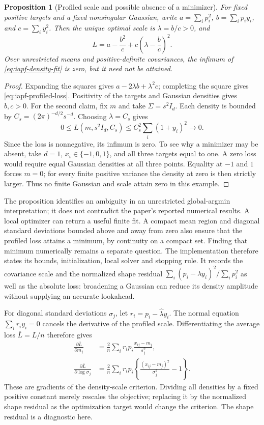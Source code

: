 \documentclass[11pt]{article}
\newtheorem{proposition}{Proposition}
\begin{document}
\begin{proposition}[Profiled scale and possible absence of a minimizer]
For fixed positive targets and a fixed nonsingular Gaussian, write
$a=\sum_i p_i^2$, $b=\sum_i p_i y_i$, and $c=\sum_i y_i^2$.
Then the unique optimal scale is $\lambda=b/c>0$, and
\begin{equation}
 L=a-\frac{b^2}{c}+c\left(\lambda-\frac bc\right)^2.
 \label{eq:iapf-profiled-loss}
\end{equation}
Over unrestricted means and positive-definite covariances, the infimum of
\eqref{eq:iapf-density-fit} is zero, but it need not be attained.
\end{proposition}
\begin{proof}
Expanding the squares gives $a-2\lambda b+\lambda^2c$; completing the
square gives \eqref{eq:iapf-profiled-loss}. Positivity of the targets and
Gaussian densities gives $b,c>0$.
For the second claim, fix $m$ and take $\Sigma=s^2I_d$. Each density is
bounded by $C_s=(2\pi)^{-d/2}s^{-d}$. Choosing $\lambda=C_s$ gives
\[
 0\le L(m,s^2I_d,C_s)
      \le C_s^2\sum_i(1+y_i)^2\longrightarrow0.
\]
Since the loss is nonnegative, its infimum is zero. To see why a minimizer
may be absent, take $d=1$, $x_i\in\{-1,0,1\}$, and all three targets
equal to one. A zero loss would require equal Gaussian densities at all
three points. Equality at $-1$ and $1$ forces $m=0$; for every finite
positive variance the density at zero is then strictly larger. Thus no
finite Gaussian and scale attain zero in this example.
\end{proof}

The proposition identifies an ambiguity in an unrestricted global-argmin
interpretation; it does not contradict the paper's reported numerical
results. A local optimizer can return a useful finite fit. A compact mean
region and diagonal standard deviations bounded above and away from zero
also ensure that the profiled loss attains a minimum, by continuity on a
compact set. Finding that minimum numerically remains a separate question.
The implementation therefore states its bounds, initialization, local
solver and stopping rule. It records the covariance scale and the normalized
shape residual $\sum_i(p_i-\widehat\lambda y_i)^2/\sum_i p_i^2$ as well as
the absolute loss: broadening a Gaussian can reduce its density amplitude
without supplying an accurate lookahead.

For diagonal standard deviations $\sigma_j$, let
$r_i=p_i-\widehat\lambda y_i$. The normal equation
$\sum_i r_i y_i=0$ cancels the derivative of the profiled scale. Differentiating
the average loss $\overline L=L/n$ therefore gives
\begin{align}
 \frac{\partial\overline L}{\partial m_j}
 &=\frac2n\sum_i r_i p_i\frac{x_{ij}-m_j}{\sigma_j^2},\\
 \frac{\partial\overline L}{\partial\log\sigma_j}
 &=\frac2n\sum_i r_i p_i
       \left\{\frac{(x_{ij}-m_j)^2}{\sigma_j^2}-1\right\}.
\end{align}
These are gradients of the density-scale criterion. Dividing all densities
by a fixed positive constant merely rescales the objective; replacing it by
the normalized shape residual as the optimization target would change the
criterion. The shape residual is a diagnostic here.
\end{document}
